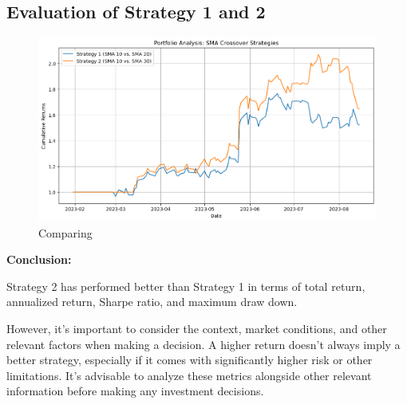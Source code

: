 \documentclass[12pt,a4paper]{article}
\begin{document}
    \subsection{Evaluation of Strategy 1 and 2}
    \begin{figure}[h]
        \centering
        \includegraphics[scale=0.50]{Adj_SS/PortAnalysis.png}
              \caption{Comparing}
    \end{figure}
\textbf{Conclusion:}
\par{\newline Strategy 2 has performed better than Strategy 1 in terms of total return, annualized return, Sharpe ratio, and maximum draw down.
\par\newline However, it's important to consider the context, market conditions, and other relevant factors when making a decision. A higher return doesn't always imply a better strategy, especially if it comes with significantly higher risk or other limitations. It's advisable to analyze these metrics alongside other relevant information before making any investment decisions.}
\clearpage
\end{document}
